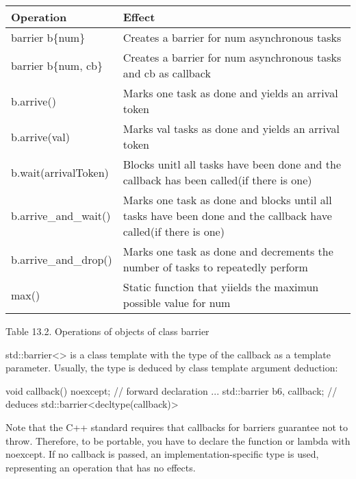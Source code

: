 \begin{longtable}[c]{|l|l|}
\hline
\textbf{Operation} & \textbf{Effect}                                                 \\ \hline
\endfirsthead
%
\endhead
%
barrier b\{num\}   & Creates a barrier for num asynchronous tasks                    \\ \hline
barrier b\{num, cb\}  & Creates a barrier for num asynchronous tasks and cb as callback                                                \\ \hline
b.arrive()         & Marks one task as done and yields an arrival token              \\ \hline
b.arrive(val)      & Marks val tasks as done and yields an arrival token             \\ \hline
b.wait(arrivalToken)  & Blocks unitl all tasks have been done and the callback has been called(if there is one)                        \\ \hline
b.arrive\_and\_wait() & Marks one task as done and blocks until all tasks have been done and the callback have called(if there is one) \\ \hline
b.arrive\_and\_drop() & Marks one task as done and decrements the number of tasks to repeatedly perform                                \\ \hline
max()              & Static function that yiields the maximun possible value for num \\ \hline
\end{longtable}

\begin{center}
Table 13.2. Operations of objects of class barrier
\end{center}

std::barrier<> is a class template with the type of the callback as a template parameter. Usually, the type is deduced by class template argument deduction:

\begin{cpp}
void callback() noexcept; // forward declaration
...
std::barrier b{6, callback}; // deduces std::barrier<decltype(callback)>
\end{cpp}

Note that the C++ standard requires that callbacks for barriers guarantee not to throw. Therefore, to be portable, you have to declare the function or lambda with noexcept. If no callback is passed, an implementation-specific type is used, representing an operation that has no effects.

